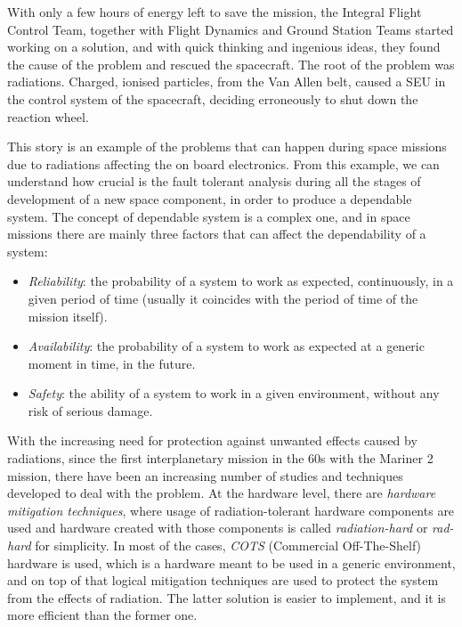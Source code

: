 With only a few hours of energy left to save the mission, the Integral Flight Control Team, together with Flight Dynamics and Ground Station Teams started working on a solution, and with quick thinking and ingenious ideas, they found the cause of the problem and rescued the spacecraft. The root of the problem was radiations. Charged, ionised particles, from the Van Allen belt, caused a SEU in the control system of the spacecraft, deciding erroneously to shut down the reaction wheel. \bigskip

This story is an example of the problems that can happen during space missions due to radiations affecting the on board electronics. From this example, we can understand how crucial is the fault tolerant analysis during all the stages of development of a new space component, in order to produce a dependable system. The concept of dependable system is a complex one, and in space missions there are mainly three factors that can affect the dependability of a system:

\begin{itemize}
    \item \textit{Reliability}: the probability of a system to work as expected, continuously, in a given period of time (usually it coincides with the period of time of the mission itself).
    \item \textit{Availability}: the probability of a system to work as expected at a generic moment in time, in the future.
    \item \textit{Safety}: the ability of a system to work in a given environment, without any risk of serious damage.
\end{itemize}

With the increasing need for protection against unwanted effects caused by radiations, since the first interplanetary mission in the 60s with the Mariner 2 mission, there have been an increasing number of studies and techniques developed to deal with the problem. At the hardware level, there are \textit{hardware mitigation techniques}, where usage of radiation-tolerant hardware components are used and hardware created with those components is called \textit{radiation-hard} or \textit{rad-hard} for simplicity. In most of the cases, \textit{COTS} (Commercial Off-The-Shelf) hardware is used, which is a hardware meant to be used in a generic environment, and on top of that logical mitigation techniques are used to protect the system from the effects of radiation. The latter solution is easier to implement, and it is more efficient than the former one.

